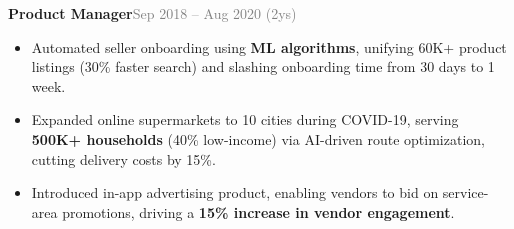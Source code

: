 \documentclass[a4paper,10pt]{article}
\newcommand{\position}[1]{\Large\bfseries #1}\vspace{0.1em}
\newcommand{\bulletitem}[1]{\item #1\vspace{0.1em}}
\newcommand{\graytext}[1]{\textcolor{grey}{#1}} %
\begin{document}
{\begin{adjustwidth}{0.5cm}{0cm}
{{\position{Product Manager}}\hfill \large\graytext{Sep 2018 – Aug 2020 (2ys)}}
\normalsize
\begin{adjustwidth}{0.5cm}{0cm}
\begin{itemize}
  \bulletitem{Automated seller onboarding using \textbf{ML algorithms}, unifying 60K+ product listings (30\% faster search) and slashing onboarding time from 30 days to 1 week.}
  \bulletitem{Expanded online supermarkets to 10 cities during COVID-19, serving \textbf{500K+ households} (40\% low-income) via AI-driven route optimization, cutting delivery costs by 15\%.}
 \bulletitem{Introduced in-app advertising product, enabling vendors to bid on service-area promotions, driving a \textbf{15\% increase in vendor engagement}.}

\end{itemize}
\end{adjustwidth}
\vspace{3pt}

\end{adjustwidth}

}
\end{document}
